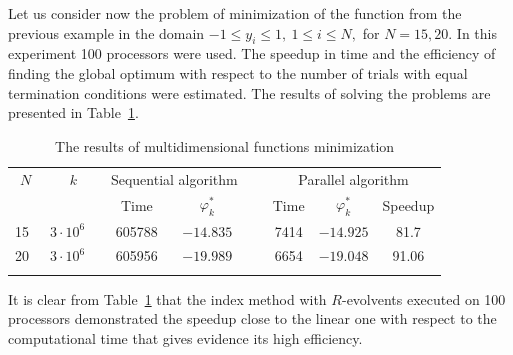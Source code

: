\begin{example}
Let us consider now the problem of minimization of the function from the previous example in the domain  $-1\leq y_i \leq 1,\ 1\leq i\leq N,$ for $N=15, 20$. In this experiment 100 processors were used. The speedup in time and the efficiency of finding the global optimum with respect to the number of trials with equal termination conditions were estimated. The results of solving the problems are presented in Table~\ref{6_tab_l1}.
	
	\begin{table}
	\caption{The results of multidimensional functions minimization}
	\label{6_tab_l1}
	\center
	\begin{tabular}{cccccccc}
		\hline\noalign{\smallskip}
		$N$ & $k$ & \multicolumn{2}{c}{ Sequential algorithm  } &\ & \multicolumn{3}{c}{Parallel algorithm } \\
		\noalign{\smallskip} \cline{3-4} \cline{6-8} \noalign{\smallskip}
		 & & Time & $\varphi_k^\ast$  &\  & Time & $\varphi_k^\ast$ & Speedup  \\
		\noalign{\smallskip} \hline \noalign{\smallskip}
		15\	&	$3\cdot10^6$ \ &	605788 & $-14.835$	& &	7414 & $-14.925$ 	&	81.7	\\
		20\	&	$3\cdot10^6$ \ &	605956 & $-19.989$	& &	6654 & $-19.048$ 	&	91.06	\\
		\noalign{\smallskip}\hline
	\end{tabular}
\end{table}

It is clear from Table~\ref{6_tab_l1} that the index method with $R$-evolvents executed on 100 processors demonstrated the speedup close to the linear one with respect to the computational time that gives evidence its high efficiency.
\end{example}
